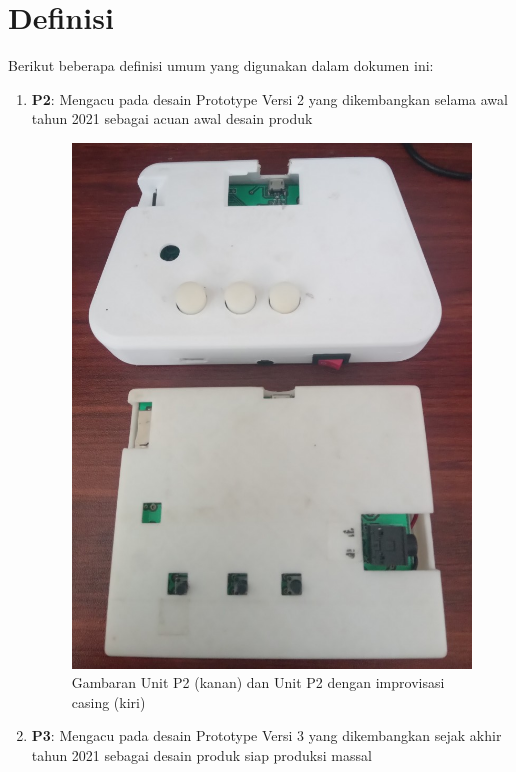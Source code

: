 \documentclass{book} %
\begin{document}
    \mainmatter %
    
    \newpage
    \chapter{Definisi}
    
    Berikut beberapa definisi umum yang digunakan dalam dokumen ini:
    
    \begin{enumerate}
    	\item \textbf{P2}: Mengacu pada desain Prototype Versi 2 yang 
    	dikembangkan selama awal tahun 2021 sebagai acuan awal desain produk
    	
    	\begin{figure}[!ht]
    		\centering
    		\includegraphics[width=300pt]{images/p2}
    		\caption{Gambaran Unit P2 (kanan) dan Unit P2 dengan improvisasi 
    		casing (kiri)}
    	\end{figure}
    
    	\item \textbf{P3}: Mengacu pada desain Prototype Versi 3 yang 
    	dikembangkan sejak akhir tahun 2021 sebagai desain produk siap produksi 
    	massal
    	

\end{enumerate}
\end{document}
